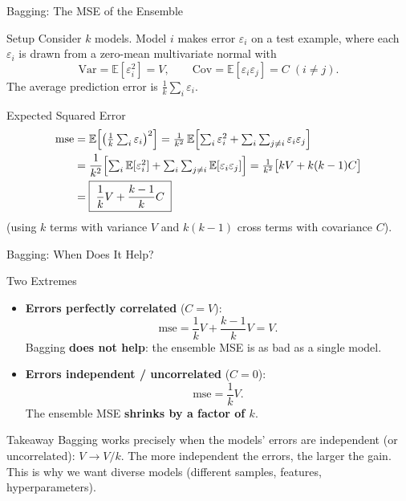 \documentclass{beamer}
\begin{document}
\begin{frame}[shrink=10]{Bagging: The MSE of the Ensemble}
  \begin{block}{Setup}
    Consider $k$ models. Model $i$ makes error $\varepsilon_i$ on a test
    example, where each $\varepsilon_i$ is drawn from a zero-mean
    multivariate normal with
    \[
      \mathrm{Var} = \mathbb{E}[\varepsilon_i^2] = V,
      \qquad
      \mathrm{Cov} = \mathbb{E}[\varepsilon_i\varepsilon_j] = C \;(i\neq j).
    \]
    The average prediction error is $\frac1k\sum_i\varepsilon_i$.
  \end{block}

  \begin{block}{Expected Squared Error}
    \begin{align*}
      \text{mse}
        &= \mathbb{E}\Bigl[\bigl(\tfrac1k\textstyle\sum_i\varepsilon_i\bigr)^2\Bigr]
         = \frac{1}{k^2}\,\mathbb{E}\Bigl[\textstyle\sum_i\varepsilon_i^2
             + \sum_{i}\sum_{j\neq i}\varepsilon_i\varepsilon_j\Bigr]\\
        &= \frac{1}{k^2}\Bigl[\textstyle\sum_i\mathbb{E}[\varepsilon_i^2]
             + \sum_i\sum_{j\neq i}\mathbb{E}[\varepsilon_i\varepsilon_j]\Bigr]
         = \frac{1}{k^2}\bigl[kV + k(k-1)C\bigr]\\
        &= \boxed{\;\frac{1}{k}V + \frac{k-1}{k}C\;}
    \end{align*}
    (using $k$ terms with variance $V$ and $k(k-1)$ cross terms with
    covariance $C$).
  \end{block}
\end{frame}

\begin{frame}[shrink=10]{Bagging: When Does It Help?}
  \begin{block}{Two Extremes}
    \begin{itemize}\setlength\itemsep{5pt}
      \item \textbf{Errors perfectly correlated} ($C = V$):
            \[
              \text{mse} = \frac{1}{k}V + \frac{k-1}{k}V = V.
            \]
            Bagging \textbf{does not help}: the ensemble MSE is as bad as a
            single model.
      \item \textbf{Errors independent / uncorrelated} ($C = 0$):
            \[
              \text{mse} = \frac{1}{k}V.
            \]
            The ensemble MSE \textbf{shrinks by a factor of $k$}.
    \end{itemize}
  \end{block}

  \begin{alertblock}{Takeaway}
    Bagging works precisely when the models' errors are independent (or
    uncorrelated): $V \to V/k$. The more independent the errors, the
    larger the gain. This is why we want diverse models (different samples,
    features, hyperparameters).
  \end{alertblock}
\end{frame}
\end{document}
